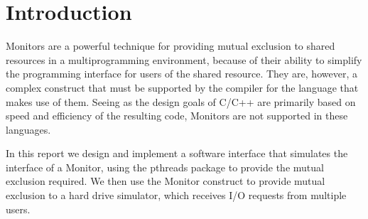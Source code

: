 \documentclass[12pt]{report}
\begin{document}


\tableofcontents %
\newpage
\section{Introduction}
Monitors are a powerful technique for providing mutual exclusion to shared
resources in a multiprogramming environment, because of their ability to simplify the
programming interface for users of the shared resource. They are, however, a complex
construct that must be supported by the compiler for the language that makes use of them.
Seeing as the design goals of C/C++ are primarily based on speed and efficiency of the
resulting code, Monitors are not supported in these languages. 

In this report we design and implement a software interface that simulates the interface
of a Monitor, using the pthreads package to provide the mutual exclusion required. We then
use the Monitor construct to provide mutual exclusion to a hard drive simulator, which
receives I/O requests 
from multiple users.
\end{document}

